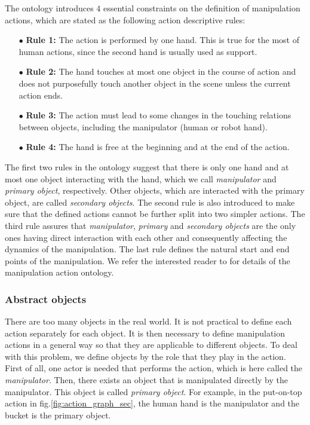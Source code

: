 The ontology introduces $4$ essential constraints on the definition of manipulation actions, which are stated as the following action descriptive rules: 
\begin{itemize}
 \item[$\bullet$] \textbf{Rule 1:} The action is performed by one hand. This is true for the most of human actions, since the second hand is usually used as support.
 \item[$\bullet$] \textbf{Rule 2:} The hand touches at most one object in the course of action and does not purposefully touch another object in the scene unless the current action ends.
 \item[$\bullet$] \textbf{Rule 3:} The action must lead to some changes in the touching relations between objects, including the manipulator (\eg human or robot hand).
 \item[$\bullet$] \textbf{Rule 4:} The hand is free at the beginning and at the end of the action.
\end{itemize}

The first two rules in the ontology suggest that there is only one hand and at most one object interacting with the hand, which we call {\it manipulator} and {\it primary object}, respectively. Other objects, which are interacted with the primary object, are called {\it secondary objects}. The second rule is also introduced to make sure that the defined actions cannot be further split into two simpler actions. The third rule assures that {\it manipulator}, {\it primary} and {\it secondary objects} are the only ones having direct interaction with each other and consequently affecting the dynamics of the manipulation. The last  rule defines the natural start and end points of the manipulation.  We refer the interested reader to \cite{TAMD13} for details of the manipulation action ontology.


\subsubsection{Abstract objects}

There are too many objects in the real world.
It is not practical to define each action separately for each object.
It is then necessary to define manipulation actions in a general way so that they are applicable to different objects.
To deal with this problem, we define objects by the role that they play in the action.
First of all, one actor is needed that performs the action, which is here called the \textit{manipulator}.
Then, there exists an object that is manipulated directly by the manipulator.
This object is called \textit{primary object}.
For example, in the put-on-top action in fig.\ref{fig:action_graph_sec}, the human hand is the manipulator and the bucket is the primary object.

